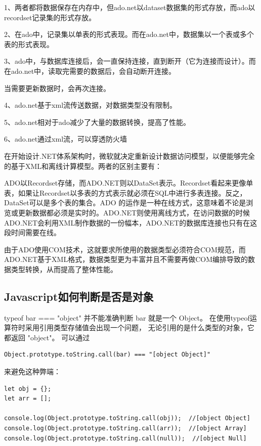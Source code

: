 \documentclass{book}
\begin{document}
1、两者都将数据保存在内存中，但ado.net以dataset数据集的形式存放，而ado以recordset记录集的形式存放。

 2、在ado中，记录集以单表的形式表现。而在ado.net中，数据集以一个表或多个表的形式表现。

 3、ado中，与数据库连接后，会一直保持连接，直到断开（它为连接而设计）。而在ado.net中，读取完需要的数据后，会自动断开连接。

     当需要更新数据时，会再次连接。

 4、ado.net基于xml流传送数据，对数据类型没有限制。

 5、ado.net相对于ado减少了大量的数据转换，提高了性能。

 6、ado.net通过xml流，可以穿透防火墙

在开始设计.NET体系架构时，微软就决定重新设计数据访问模型，以便能够完全的基于XML和离线计算模型。两者的区别主要有：

ADO以Recordset存储，而ADO.NET则以DataSet表示。Recordset看起来更像单表，如果让Recordset以多表的方式表示就必须在SQL中进行多表连接。反之，DataSet可以是多个表的集合。ADO 的运作是一种在线方式，这意味着不论是浏览或更新数据都必须是实时的。ADO.NET则使用离线方式，在访问数据的时候ADO.NET会利用XML制作数据的一份幅本，ADO.NET的数据库连接也只有在这段时间需要在线。

由于ADO使用COM技术，这就要求所使用的数据类型必须符合COM规范，而ADO.NET基于XML格式，数据类型更为丰富并且不需要再做COM编排导致的数据类型转换，从而提高了整体性能。

\subsection{Javascript如何判断是否是对象}

typeof bar === "object" 并不能准确判断 bar 就是一个 Object。
在使用typeof运算符时采用引用类型存储值会出现一个问题，
无论引用的是什么类型的对象，它都返回 "object"。
可以通过

\begin{lstlisting}[language=VBScript]
Object.prototype.toString.call(bar) === "[object Object]" 
\end{lstlisting}

来避免这种弊端：

\begin{lstlisting}[language=VBScript]
let obj = {};
let arr = [];

console.log(Object.prototype.toString.call(obj));  //[object Object]
console.log(Object.prototype.toString.call(arr));  //[object Array]
console.log(Object.prototype.toString.call(null));  //[object Null]
\end{lstlisting}
\end{document}
